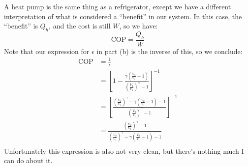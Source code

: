 \documentclass[10pt]{article}
\begin{document}
\begin{enumerate}[label=\alph*)]
			\begin{solution}
				A heat pump is the same thing as a refrigerator, except we have a different interpretation 
				of what is considered a ``benefit'' in our system. In this case, the ``benefit'' is $Q_h$,
				and the cost is still $W$, so we have:
				\[
					\mathrm{COP} = \frac{Q_h}{W}
				\] 
				Note that our expression for $\epsilon$ in part (b) is the inverse of this, so we 
				conclude:
				\begin{align*}
					\mathrm{COP} &= \frac{1}{\epsilon} \\
								 &= \left[ 1 - \frac{\gamma\left( \frac{V_2}{V_1} - 1 \right) }{\left( \frac{V_2}{V_1} \right)^\gamma - 1} \right]^{-1}\\
								 &= \left[ \frac{\left( \frac{V_2}{V_1} \right)^\gamma - \gamma\left( \frac{V_2}{V_1}-1 \right) - 1 }{\left( \frac{V_2}{V_1} \right)^\gamma - 1}\right]^{-1}  \\
					&= \frac{\left( \frac{V_2}{V_1} \right)^\gamma - 1}{
					\left( \frac{V_2}{V_1} \right)^\gamma -\gamma \left( \frac{V_2}{V_1} -1\right)-1 }\\
				\end{align*} 
				Unfortunately this expression is also not very clean, but there's nothing much I can do about it.
			\end{solution}
	\end{enumerate}

	\pagebreak
\end{document}
